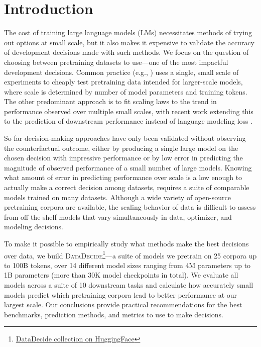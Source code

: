 \documentclass{article}
\theoremstyle{plain}
\theoremstyle{definition}
\theoremstyle{remark}
\newcommand{\numEvals}{10}
\newcommand{\projSuiteLong}{\textsc{DataDecide}}
\begin{document}
\section{Introduction}
The cost of training large language models (LMs) necessitates methods of trying out options at small scale, but it also makes it expensive to validate the accuracy of development decisions made with such methods. We focus on the question of choosing between pretraining datasets to use---one of the most impactful development decisions.
Common practice (e.g., \citealp{li2024datacomplmsearchgenerationtraining}) uses a single, small scale of experiments to cheaply test pretraining data intended for larger-scale models, where scale is determined by number of model parameters and training tokens. The other predominant approach is to fit scaling laws \citep{kaplan2020scalinglawsneurallanguage, hoffmann2022trainingcomputeoptimallargelanguage, choshen2024hitchhikersguidescalinglaw} to the trend in performance observed over multiple small scales, with recent work extending this to the prediction of downstream performance instead of language modeling loss \citep{gadre2024languagemodelsscalereliably, Dubey2024TheL3, bhagia2024establishingtaskscalinglaws}. 

So far decision-making approaches have only been validated without observing the counterfactual outcome, either by producing a single large model on the chosen decision with impressive performance or by low error in predicting the magnitude of observed performance of a small number of large models. Knowing what amount of error in predicting performance over scale is a low enough to actually make a correct decision among datasets, requires a suite of comparable models trained on many datasets. Although a wide variety of open-source pretraining corpora are available, the scaling behavior of data is difficult to assess from off-the-shelf models that vary simultaneously in data, optimizer, and modeling decisions. 

To make it possible to empirically study what methods make the best decisions over data, we build \projSuiteLong{}\footnote{\href{https://huggingface.co/collections/allenai/datadecide-67edb1d2bacba40b5d3ed633}{DataDecide collection on HuggingFace}}---a suite of models we pretrain on 25 corpora up to 100B tokens, over 14 different model sizes ranging from 4M parameters up to 1B parameters (more than 30K model checkpoints in total). We evaluate all models across a suite of \numEvals{} downstream tasks and calculate how accurately small models predict which pretraining corpora lead to better performance at our largest scale. Our conclusions provide practical recommendations for the best benchmarks, prediction methods, and metrics to use to make decisions.
\end{document}
